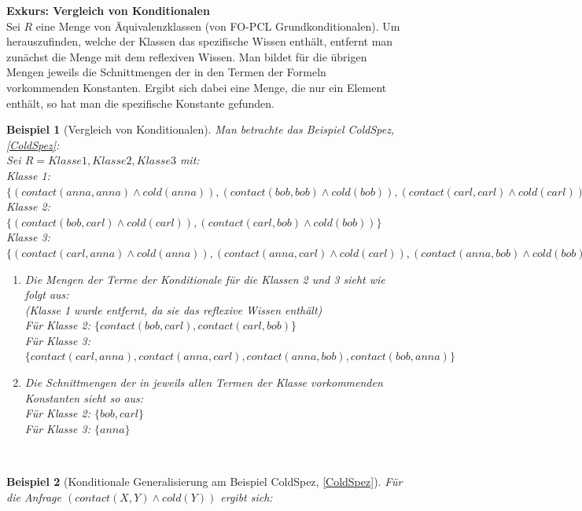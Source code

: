\documentclass[a4paper, 11pt]{book}
\newtheorem{Bsp}{Beispiel}[section]
\begin{document}
\begin{itemize}
	\textbf{Exkurs: Vergleich von Konditionalen} \label{Vergleich von Konditionalen}  \\
	Sei $ R $ eine Menge von Äquivalenzklassen (von FO-PCL Grundkonditionalen). Um herauszufinden, welche der Klassen das  spezifische Wissen enthält, entfernt man zunächst die Menge mit dem reflexiven Wissen. Man bildet für die übrigen Mengen jeweils die Schnittmengen der in den Termen der Formeln vorkommenden Konstanten. Ergibt sich dabei eine Menge, die nur ein Element enthält, so hat man die spezifische Konstante gefunden. 
	\begin{Bsp}[Vergleich von Konditionalen]
		Man betrachte das Beispiel ColdSpez, \ref{ColdSpez}:\\
		Sei $ R = {Klasse 1, Klasse 2, Klasse 3} $ mit:\\
		Klasse 1: $ \{(contact(anna,anna) \land cold(anna)), (contact(bob,bob) \land cold(bob)), (contact(carl,carl) \land cold(carl)) \} $\\
		Klasse 2: $ \{(contact(bob,carl) \land cold(carl)), (contact(carl,bob) \land cold(bob)) \} $\\
		Klasse 3: $ \{(contact(carl,anna) \land cold(anna)), (contact(anna, carl) \land cold(carl)), (contact(anna,bob) \land cold(bob)), (contact(bob, anna) \land cold(anna)) \} $\\
 		\begin{enumerate}
 			\item Die Mengen der Terme der Konditionale für die Klassen 2 und 3 sieht wie folgt aus:\\
 			(Klasse 1 wurde entfernt, da sie das reflexive Wissen enthält)\\
 			Für Klasse 2: $ \{contact(bob,carl), contact(carl,bob)\}$ \\
 			Für Klasse 3: $ \{contact(carl,anna), contact(anna, carl), contact(anna,bob), contact(bob, anna) \}$ \\
 			\item Die Schnittmengen der in jeweils allen Termen der Klasse vorkommenden Konstanten sieht so aus:\\
 			Für Klasse 2: $ \{bob, carl\}$ \\
 			Für Klasse 3: $ \{anna\} $ 
 		\end{enumerate}\
	\end{Bsp}
		\begin{Bsp}[Konditionale Generalisierung am Beispiel ColdSpez, \ref{ColdSpez}]
			Für die Anfrage $ (contact(X,Y) \land cold(Y)) $ ergibt sich:\\

\end{Bsp}
\end{itemize}
\end{document}
